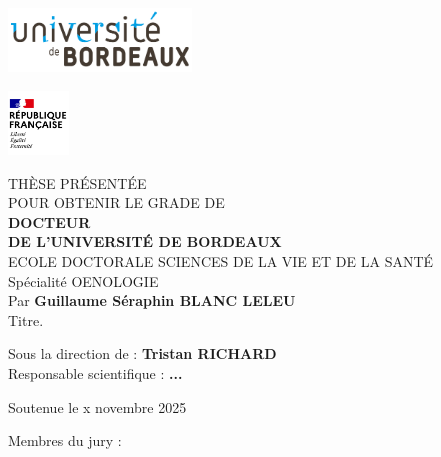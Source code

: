 
\pagestyle{empty}


\includegraphics[scale=1, height=1.7cm]{0_Liminaires/Images/UBX_logo.png}
\hfill

\includegraphics[scale=1, height=1.7cm]{0_Liminaires/Images/RF.png} %
\hfill

\begin{center}
\doublespacing
\begin{Large}

THÈSE PRÉSENTÉE\\ POUR OBTENIR LE GRADE DE \\
{\LARGE \textbf{DOCTEUR\\DE L'UNIVERSITÉ DE BORDEAUX} } \\
\vspace{0.55cm}
ECOLE DOCTORALE SCIENCES DE LA VIE ET DE LA SANTÉ\\
{\normalsize Spécialité OENOLOGIE} \\
\vspace{0.55cm}
Par \textbf{Guillaume Séraphin BLANC LELEU} \\
\vspace{0.55cm}
{\Large Titre.}
\end{Large}
\vspace{0.55cm}
\begin{normalsize}
\begin{singlespace}
Sous la direction de : \textbf{Tristan RICHARD}\\
Responsable scientifique : \textbf{...}
\end{singlespace}
\end{normalsize}
\end{center}
\vfill
\begin{center}
{\large Soutenue le x novembre 2025 }\\    
\end{center}
\vfill
Membres du jury :
\begin{table}[b]
\centering
{}
\end{table}

